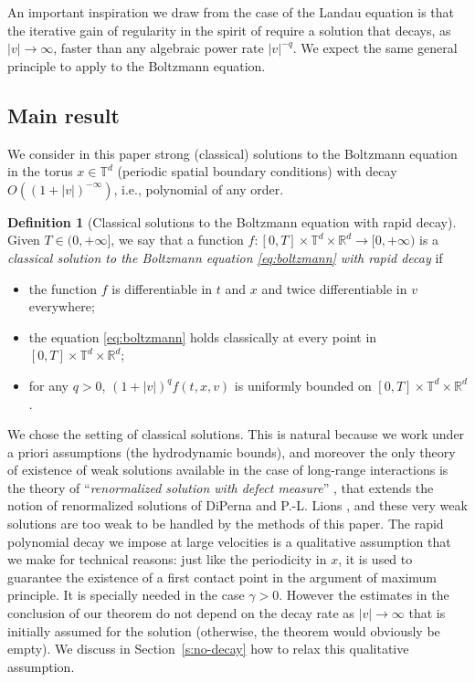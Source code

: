 \documentclass[11pt]{article}
\newcommand{\ie}{i.e.,\xspace}
\theoremstyle{plain}
\theoremstyle{definition}
\newtheorem{defn}[thm]{Definition}
\numberwithin{equation}{section}
\newcommand{\R}{\mathbb R}
\begin{document}
An important inspiration we draw from the case of the Landau equation
is that the iterative gain of regularity in the spirit of
\cite{henderson2017c} require a solution that decays, as
$|v| \to \infty$, faster than any algebraic power rate $|v|^{-q}$. We
expect the same general principle to apply to the Boltzmann
equation.

\subsection{Main result}

We consider in this paper strong (classical) solutions to the
Boltzmann equation in the torus $x \in \mathbb T^d$ (periodic spatial
boundary conditions) with decay $O((1+|v|)^{-\infty})$,
\ie polynomial of any order.

\begin{defn}[Classical solutions to the Boltzmann equation with rapid
decay] \label{d:solutions-rapid-decay} Given $T \in (0,+\infty]$, we
say that a function
$f : [0,T] \times \mathbb T^d \times \R^d \to [0,+\infty)$ is a
\emph{classical solution to the Boltzmann equation
\eqref{eq:boltzmann} with rapid decay} if
\begin{itemize}
\item the function $f$ is differentiable in $t$ and $x$ and twice
differentiable in $v$ everywhere;
\item the equation \eqref{eq:boltzmann} holds classically at every
point in $[0,T] \times \mathbb T^d \times \R^d$;
\item for any $q>0$, $(1+|v|)^q f(t,x,v)$ is uniformly bounded on
$[0,T] \times \mathbb T^d \times \R^d$.
\end{itemize}
\end{defn}

We chose the setting of classical solutions. This is natural because
we work under a priori assumptions (the hydrodynamic bounds),
and moreover the only theory of existence of weak solutions available
in the case of long-range interactions is the theory of
``\emph{renormalized solution with defect measure}'' \cite{MR1857879},
that extends the notion of renormalized solutions of DiPerna and
P.-L. Lions \cite{MR1014927}, and these very weak solutions are too
weak to be handled by the methods of this paper. The rapid polynomial
decay we impose at large velocities is a qualitative assumption that
we make for technical reasons: just like the periodicity in $x$, it is
used to guarantee the existence of a first contact point in the
argument of maximum principle. It is specially needed in the case
$\gamma >0$. However the estimates in the conclusion of our theorem do
not depend on the decay rate as $|v| \to \infty$ that is initially
assumed for the solution (otherwise, the theorem would obviously be
empty). We discuss in Section~\ref{s:no-decay} how to relax this
qualitative assumption.
\end{document}
